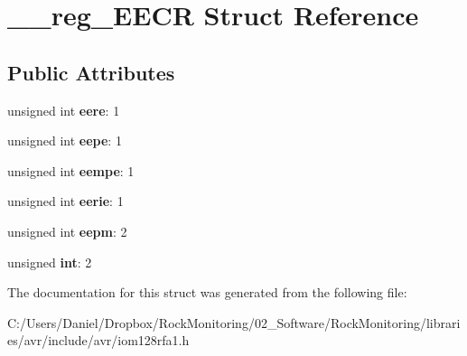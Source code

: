 \hypertarget{struct____reg___e_e_c_r}{}\section{\+\_\+\+\_\+reg\+\_\+\+E\+E\+CR Struct Reference}
\label{struct____reg___e_e_c_r}
\subsection*{Public Attributes}
\begin{DoxyCompactItemize}
\item 
unsigned int {\bfseries eere}\+: 1\hypertarget{struct____reg___e_e_c_r_afbda80126cf44f8e5f9e11971becab64}{}\label{struct____reg___e_e_c_r_afbda80126cf44f8e5f9e11971becab64}

\item 
unsigned int {\bfseries eepe}\+: 1\hypertarget{struct____reg___e_e_c_r_ab657a6e85724cae85313a3bd40c1b40d}{}\label{struct____reg___e_e_c_r_ab657a6e85724cae85313a3bd40c1b40d}

\item 
unsigned int {\bfseries eempe}\+: 1\hypertarget{struct____reg___e_e_c_r_adc9c298c72743e238e5c9f769d54318c}{}\label{struct____reg___e_e_c_r_adc9c298c72743e238e5c9f769d54318c}

\item 
unsigned int {\bfseries eerie}\+: 1\hypertarget{struct____reg___e_e_c_r_a8f12edfde0165a862cbcbee17f8e72f6}{}\label{struct____reg___e_e_c_r_a8f12edfde0165a862cbcbee17f8e72f6}

\item 
unsigned int {\bfseries eepm}\+: 2\hypertarget{struct____reg___e_e_c_r_a5bcb7e226076f1e634d25ebc0c203dbe}{}\label{struct____reg___e_e_c_r_a5bcb7e226076f1e634d25ebc0c203dbe}

\item 
unsigned {\bfseries int}\+: 2\hypertarget{struct____reg___e_e_c_r_a6e07553bd6dd1fbb2bdf90c5af2e6c33}{}\label{struct____reg___e_e_c_r_a6e07553bd6dd1fbb2bdf90c5af2e6c33}

\end{DoxyCompactItemize}


The documentation for this struct was generated from the following file\+:\begin{DoxyCompactItemize}
\item 
C\+:/\+Users/\+Daniel/\+Dropbox/\+Rock\+Monitoring/02\+\_\+\+Software/\+Rock\+Monitoring/libraries/avr/include/avr/iom128rfa1.\+h\end{DoxyCompactItemize}
